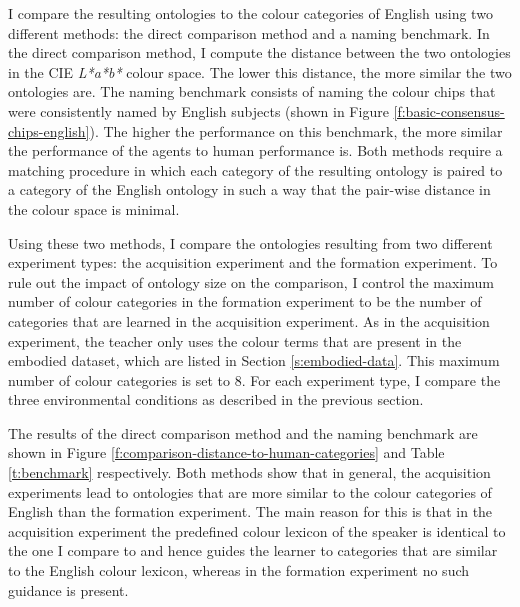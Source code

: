 I compare the resulting ontologies to the colour categories of English
\citep{sturges95location} using two different methods: the direct
comparison method and a naming benchmark. In the direct
comparison method, I compute the distance between the two ontologies
in the CIE \emph{L*a*b*} colour space. The lower this distance, the
more similar the two ontologies are. The naming benchmark consists of
naming the colour chips that were consistently named by English
subjects \citep{sturges95location} (shown in Figure
\ref{f:basic-consensus-chips-english}). The higher the performance on
this benchmark, the more similar the performance of the agents to
human performance is. Both methods require a matching procedure in
which each category of the resulting ontology is paired to a category
of the English ontology in such a way that the pair-wise distance in
the colour space is minimal.

Using these two methods, I compare the ontologies resulting from two
different experiment types: the acquisition experiment and the
formation experiment. To rule out the impact of ontology size on the
comparison, I control the maximum number of colour categories in the
formation experiment to be the number of categories that are learned
in the acquisition experiment. As in the acquisition experiment, the
teacher only uses the colour terms that are present in the embodied
dataset, which are listed in Section \ref{s:embodied-data}. This
maximum number of colour categories is set to 8. For each experiment
type, I compare the three environmental conditions as described in the
previous section.

The results of the direct comparison method and the naming benchmark
are shown in Figure \ref{f:comparison-distance-to-human-categories}
and Table \ref{t:benchmark} respectively. Both methods show that in
general, the acquisition experiments lead to ontologies that are more
similar to the colour categories of English than the formation
experiment. The main reason for this is that in the acquisition
experiment the predefined colour lexicon of the speaker is identical
to the one I compare to and hence guides the learner to categories
that are similar to the English colour lexicon, whereas in the
formation experiment no such guidance is present.

